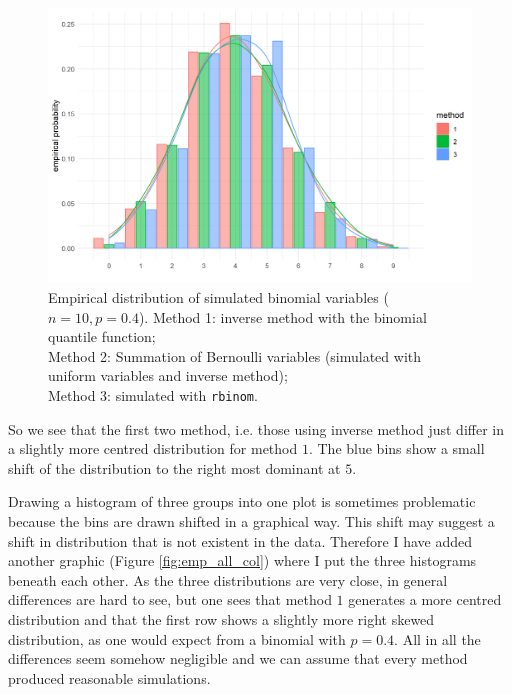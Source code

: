 \begin{figure}[th]
\centering
\includegraphics[scale = 0.7]{ex2/emp_all.png}
\caption{Empirical distribution of simulated binomial variables ($n=10, p=0.4$). Method 1: inverse method with the binomial quantile function; \\
Method 2: Summation of Bernoulli variables (simulated with uniform variables and inverse method);\\
Method 3: simulated with \texttt{rbinom}.}
\label{fig:emp_all}
\end{figure}  

So we see that the first two method, i.e. those using inverse method just differ in a slightly more centred distribution for method $1$. The blue bins show a small shift of the distribution to the right most dominant at $5.$

Drawing a histogram of three groups into one plot is sometimes problematic because the bins are drawn shifted in a graphical way. This shift may suggest a shift in distribution that is not existent in the data. Therefore I have added another graphic (Figure \ref{fig:emp_all_col}) where I put the three histograms beneath each other. As the three distributions are very close, in general differences are hard to see, but one sees that method $1$ generates a more centred distribution and that the first row shows a slightly more right skewed distribution, as one would expect from a binomial with $p=0.4$. All in all the differences seem somehow negligible and we can assume that every method produced reasonable simulations.


